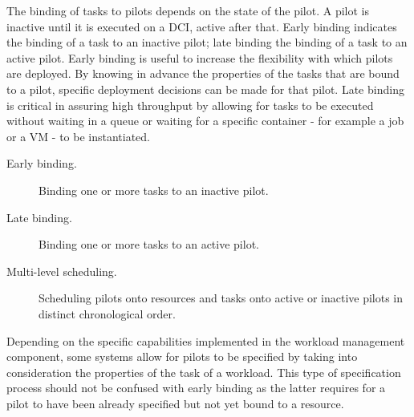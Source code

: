 \documentclass{sig-alternate}
\begin{document}
The binding of tasks to pilots depends on the state of the pilot. A pilot is
inactive until it is executed on a DCI, active after that. Early binding
indicates the binding of a task to an inactive pilot; late binding the binding
of a task to an active pilot. Early binding is useful to increase the
flexibility with which pilots are deployed. By knowing in advance the
properties of the tasks that are bound to a pilot, specific deployment
decisions can be made for that pilot. Late binding is critical in assuring high
throughput by allowing for tasks to be executed without waiting in a queue or
waiting for a specific container - for example a job or a VM - to be
instantiated.


\begin{description}

\item[Early binding.] Binding one or more tasks to an inactive pilot.

\item[Late binding.] Binding one or more tasks to an active pilot.

\item[Multi-level scheduling.] Scheduling pilots onto resources and tasks onto
active or inactive pilots in distinct chronological order.

\end{description}

Depending on the specific capabilities implemented in the workload management
component, some \pilotjob systems allow for pilots to be specified by taking
into consideration the properties of the task of a workload. This type of
specification process should not be confused with early binding as the latter
requires for a pilot to have been already specified but not yet bound to a
resource.


\end{document}
